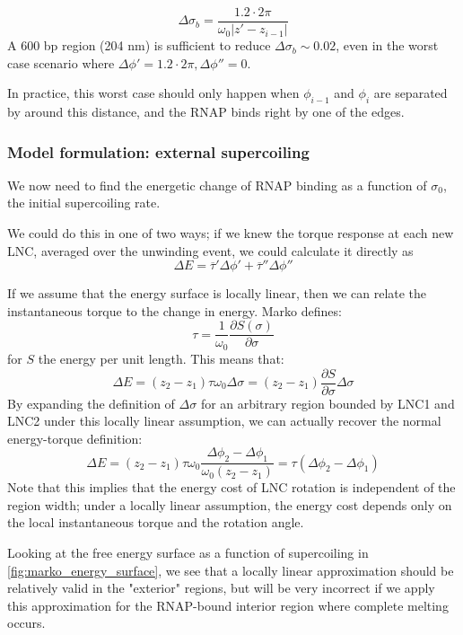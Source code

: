 \documentclass[11pt]{article}
\begin{document}
\begin{equation}
\Delta \sigma_b = \frac{1.2 \cdot 2 \pi}{\omega_0 |z' - z_{i-1}|}
\end{equation}
A 600 bp region (204 nm) is sufficient to reduce \(\Delta \sigma_b \sim 0.02\), even in the worst case scenario where \(\Delta \phi' = 1.2 \cdot 2  \pi, \Delta \phi'' = 0\).

In practice, this worst case should only happen when \(\phi_{i-1}\) and \(\phi_i\) are separated by around this distance, and the RNAP binds right by one of the edges.

\subsubsection{Model formulation: external supercoiling}
We now need to find the energetic change of RNAP binding as a function of \(\sigma_0\), the initial supercoiling rate.

We could do this in one of two ways; if we knew the torque response at each new LNC, averaged over the unwinding event, we could calculate it directly as
\begin{equation}
    \Delta E = \overline \tau' \Delta \phi' + \overline \tau'' \Delta \phi''
    \label{eq:direct_torque_calc}
\end{equation}

If we assume that the energy surface is locally linear, then we can relate the instantaneous torque to the change in energy. Marko defines:
\[ \tau = \frac{1}{\omega_0} \frac{\partial S(\sigma)}{\partial \sigma}\]
for \(S\) the energy per unit length. This means that:
\begin{equation}
    \Delta E = (z_2 - z_1) \tau \omega_0 \Delta \sigma = (z_2 - z_1) \frac{\partial S}{\partial \sigma} \Delta \sigma
\end{equation}
By expanding the definition of \(\Delta \sigma\) for an arbitrary region bounded by LNC1 and LNC2 under this locally linear assumption, we can actually recover the normal energy-torque definition:
\[\Delta E = (z_2 - z_1) \tau \omega_0 \frac{\Delta\phi_2 - \Delta\phi_1}{\omega_0 (z_2 - z_1)} = \tau (\Delta \phi_2 - \Delta\phi_1)\]
Note that this implies that the energy cost of LNC rotation is independent of the region width; under a locally linear assumption, the energy cost depends only on the local instantaneous torque and the rotation angle.

Looking at the free energy surface as a function of supercoiling in \autoref{fig:marko_energy_surface}, we see that a locally linear approximation should be relatively valid in the "exterior" regions, but will be very incorrect if we apply this approximation for the RNAP-bound interior region where complete melting occurs.
\end{document}
